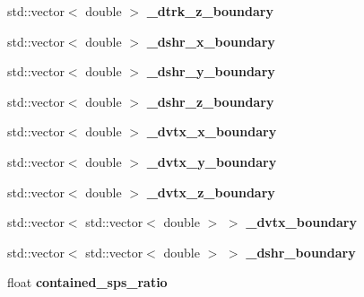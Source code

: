 \begin{DoxyCompactItemize}
\item 
std\+::vector$<$ double $>$ {\bfseries \+\_\+dtrk\+\_\+z\+\_\+boundary}\hypertarget{classanalysis_1_1ContainmentAnalysis_a833a1aaeb93bec0a73ff59f25dcdcba9}{}\label{classanalysis_1_1ContainmentAnalysis_a833a1aaeb93bec0a73ff59f25dcdcba9}

\item 
std\+::vector$<$ double $>$ {\bfseries \+\_\+dshr\+\_\+x\+\_\+boundary}\hypertarget{classanalysis_1_1ContainmentAnalysis_a36e81065e3d4ea6884227063ce5047b4}{}\label{classanalysis_1_1ContainmentAnalysis_a36e81065e3d4ea6884227063ce5047b4}

\item 
std\+::vector$<$ double $>$ {\bfseries \+\_\+dshr\+\_\+y\+\_\+boundary}\hypertarget{classanalysis_1_1ContainmentAnalysis_ae623b7efd1d545fbe9d32bafac77718d}{}\label{classanalysis_1_1ContainmentAnalysis_ae623b7efd1d545fbe9d32bafac77718d}

\item 
std\+::vector$<$ double $>$ {\bfseries \+\_\+dshr\+\_\+z\+\_\+boundary}\hypertarget{classanalysis_1_1ContainmentAnalysis_ac45217df52482cc670b0ea4bd86c8257}{}\label{classanalysis_1_1ContainmentAnalysis_ac45217df52482cc670b0ea4bd86c8257}

\item 
std\+::vector$<$ double $>$ {\bfseries \+\_\+dvtx\+\_\+x\+\_\+boundary}\hypertarget{classanalysis_1_1ContainmentAnalysis_af20b04910d32f51b8ade5f0bb6558e35}{}\label{classanalysis_1_1ContainmentAnalysis_af20b04910d32f51b8ade5f0bb6558e35}

\item 
std\+::vector$<$ double $>$ {\bfseries \+\_\+dvtx\+\_\+y\+\_\+boundary}\hypertarget{classanalysis_1_1ContainmentAnalysis_ab2894eefd881547b87ed6c932b08c4df}{}\label{classanalysis_1_1ContainmentAnalysis_ab2894eefd881547b87ed6c932b08c4df}

\item 
std\+::vector$<$ double $>$ {\bfseries \+\_\+dvtx\+\_\+z\+\_\+boundary}\hypertarget{classanalysis_1_1ContainmentAnalysis_a7216bd74951faf0862964a2d41c4c280}{}\label{classanalysis_1_1ContainmentAnalysis_a7216bd74951faf0862964a2d41c4c280}

\item 
std\+::vector$<$ std\+::vector$<$ double $>$ $>$ {\bfseries \+\_\+dvtx\+\_\+boundary}\hypertarget{classanalysis_1_1ContainmentAnalysis_a063ed2f268f5c58f7823296b9aafbbe7}{}\label{classanalysis_1_1ContainmentAnalysis_a063ed2f268f5c58f7823296b9aafbbe7}

\item 
std\+::vector$<$ std\+::vector$<$ double $>$ $>$ {\bfseries \+\_\+dshr\+\_\+boundary}\hypertarget{classanalysis_1_1ContainmentAnalysis_a67f8f6bc60848aaa130169bc7be0d4e2}{}\label{classanalysis_1_1ContainmentAnalysis_a67f8f6bc60848aaa130169bc7be0d4e2}

\item 
float {\bfseries contained\+\_\+sps\+\_\+ratio}\hypertarget{classanalysis_1_1ContainmentAnalysis_ab251d5d378f9f35b95495a6ee2e519fb}{}\label{classanalysis_1_1ContainmentAnalysis_ab251d5d378f9f35b95495a6ee2e519fb}

\end{DoxyCompactItemize}


